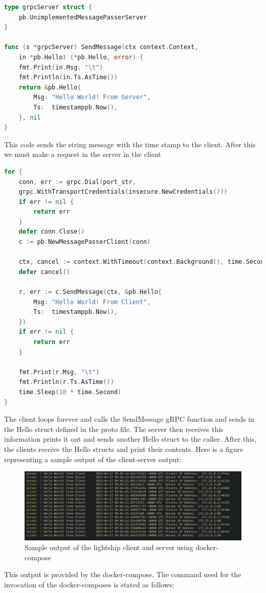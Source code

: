 \documentclass[a4paper, 11pt]{article}
\theoremstyle{nonumberplain}
\begin{document}
\begin{lstlisting}[language=go]
type grpcServer struct {
	pb.UnimplementedMessagePasserServer
}

func (s *grpcServer) SendMessage(ctx context.Context,
	in *pb.Hello) (*pb.Hello, error) {
	fmt.Print(in.Msg, "\t")
	fmt.Println(in.Ts.AsTime())
	return &pb.Hello{
		Msg: "Hello World! From Server",
		Ts:  timestamppb.Now(),
	}, nil
}
\end{lstlisting}
This code sends the string message with the time stamp to the client.
After this we must make a request in the server in the client
\begin{lstlisting}[language=go]
for {
    conn, err := grpc.Dial(port_str,
    grpc.WithTransportCredentials(insecure.NewCredentials()))
    if err != nil {
        return err
    }
    defer conn.Close()
    c := pb.NewMessagePasserClient(conn)

    ctx, cancel := context.WithTimeout(context.Background(), time.Second)
    defer cancel()

    r, err := c.SendMessage(ctx, &pb.Hello{
        Msg: "Hello World! From Client",
        Ts:  timestamppb.Now(),
    })
    if err != nil {
        return err
    }

    fmt.Print(r.Msg, "\t")
    fmt.Println(r.Ts.AsTime())
    time.Sleep(10 * time.Second)
}
\end{lstlisting}
The client loops forever and calls the SendMessage gRPC function and sends in
the Hello struct defined in the proto file. The server then receives this
information prints it out and sends another Hello struct to the caller.
After this, the clients receive the Hello structs and print their contents.
Here is a figure representing a sample output of the client-server output:
\begin{figure}[H]
    \centering
    \includegraphics[width=1.0\textwidth]{output.png}
    \caption{Sample output of the lightship client and server using
    docker-compose}
    \label{fig:output}
\end{figure}
This output is provided by the docker-compose. The command used for the
invocation of the docker-composes is stated as follows:
\end{document}

